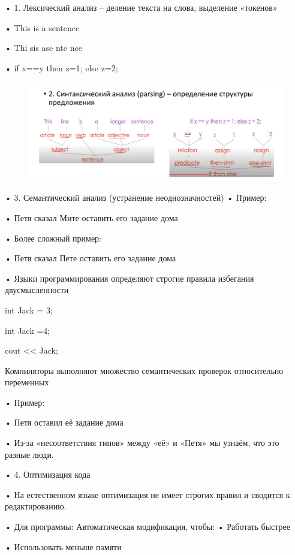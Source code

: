 \documentclass{article}
\begin{document}
• 1. Лексический анализ – деление текста на слова, выделение
«токенов»

• This is a sentence

• Thi sis ase nte nce

• if x==y then z=1; else z=2;

\begin{figure}[H]
    \centering
    \includegraphics[width=1\linewidth]{Снимок экрана 2025-02-13 084508.png}
\end{figure}

• 3. Семантический анализ (устранение неоднозначностей)
• Пример:

• Петя сказал Мите оставить его задание дома

• Более сложный пример:

• Петя сказал Пете оставить его задание дома

• Языки программирования определяют строгие правила избегания
двусмысленности

{

int Jack = 3;

{

int Jack =4;

cout << Jack;

}

}

Компиляторы выполняют множество семантических проверок
относительно переменных

• Пример:

• Петя оставил её задание дома

• Из-за «несоответствия типов» между «её» и «Петя» мы узнаём,
что это разные люди.

• 4. Оптимизация кода

• На естественном языке оптимизация не имеет строгих правил и
сводится к редактированию.

• Для программы: Автоматическая модификация, чтобы:
• Работать быстрее

• Использовать меньше памяти
\end{document}
